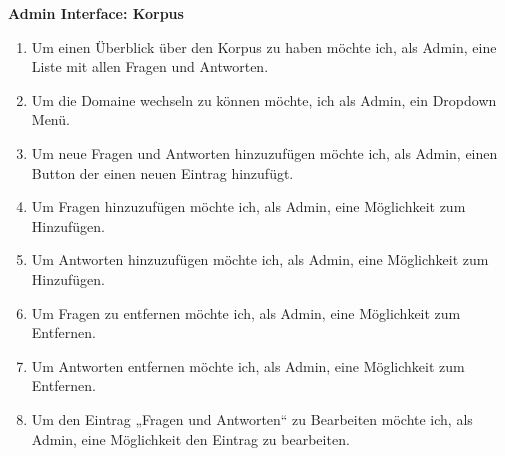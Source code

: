\textbf{Admin Interface: Korpus}
\begin{enumerate}
    \item Um einen Überblick über den Korpus zu haben möchte ich, als Admin, eine Liste mit allen Fragen und Antworten.
    \item Um die Domaine wechseln zu können möchte, ich als Admin, ein Dropdown Menü.
    \item Um neue Fragen und Antworten hinzuzufügen möchte ich, als Admin, einen Button der einen neuen Eintrag hinzufügt.
    \item Um Fragen hinzuzufügen möchte ich, als Admin, eine Möglichkeit zum Hinzufügen.
    \item Um Antworten hinzuzufügen möchte ich, als Admin, eine Möglichkeit zum Hinzufügen.
    \item Um Fragen zu entfernen möchte ich, als Admin, eine Möglichkeit zum Entfernen.
    \item Um Antworten entfernen möchte ich, als Admin, eine Möglichkeit zum Entfernen.
    \item Um den Eintrag „Fragen und Antworten“ zu Bearbeiten möchte ich, als Admin, eine Möglichkeit den Eintrag zu bearbeiten.
\end{enumerate}


